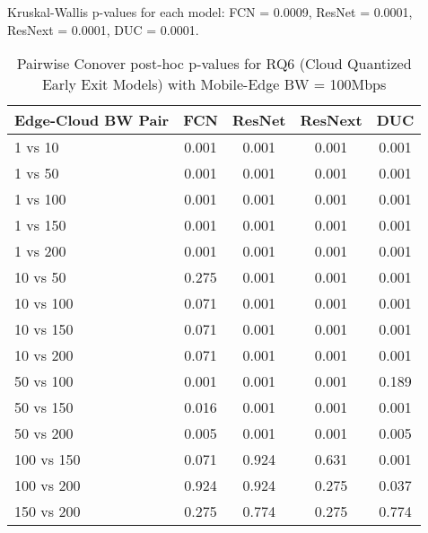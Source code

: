\begin{table}[h]
\centering
\caption{Pairwise Conover post-hoc p-values for RQ6 (Cloud Quantized Early Exit Models) with Mobile-Edge BW = 100Mbps}
\label{tab:conover_cloud_quantized_earlyexit_me100}
\smallskip
Kruskal-Wallis p-values for each model: FCN = 0.0009, ResNet = 0.0001, ResNext = 0.0001, DUC = 0.0001.

\begin{tabular}{lcccc}
\toprule
Edge-Cloud BW Pair & FCN & ResNet & ResNext & DUC \\
\midrule
1 vs 10 & 0.001 & 0.001 & 0.001 & 0.001 \\
1 vs 50 & 0.001 & 0.001 & 0.001 & 0.001 \\
1 vs 100 & 0.001 & 0.001 & 0.001 & 0.001 \\
1 vs 150 & 0.001 & 0.001 & 0.001 & 0.001 \\
1 vs 200 & 0.001 & 0.001 & 0.001 & 0.001 \\
10 vs 50 & 0.275 & 0.001 & 0.001 & 0.001 \\
10 vs 100 & 0.071 & 0.001 & 0.001 & 0.001 \\
10 vs 150 & 0.071 & 0.001 & 0.001 & 0.001 \\
10 vs 200 & 0.071 & 0.001 & 0.001 & 0.001 \\
50 vs 100 & 0.001 & 0.001 & 0.001 & 0.189 \\
50 vs 150 & 0.016 & 0.001 & 0.001 & 0.001 \\
50 vs 200 & 0.005 & 0.001 & 0.001 & 0.005 \\
100 vs 150 & 0.071 & 0.924 & 0.631 & 0.001 \\
100 vs 200 & 0.924 & 0.924 & 0.275 & 0.037 \\
150 vs 200 & 0.275 & 0.774 & 0.275 & 0.774 \\
\bottomrule
\end{tabular}
\end{table}

